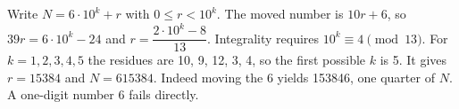 Write $ N=6\cdot10^k+r $ with $ 0\le r<10^k $. The moved number is $ 10r+6 $, so $ 39r=6\cdot10^k-24 $ and $ r=\dfrac{2\cdot10^k-8}{13}$. Integrality requires $ 10^k\equiv4\pmod{13}$. For $ k=1,2,3,4,5 $ the residues are 10, 9, 12, 3, 4, so the first possible $ k $ is 5. It gives $ r=15384 $ and $\boxed{N=615384}$. Indeed moving the 6 yields 153846, one quarter of $ N $. A one-digit number 6 fails directly.
